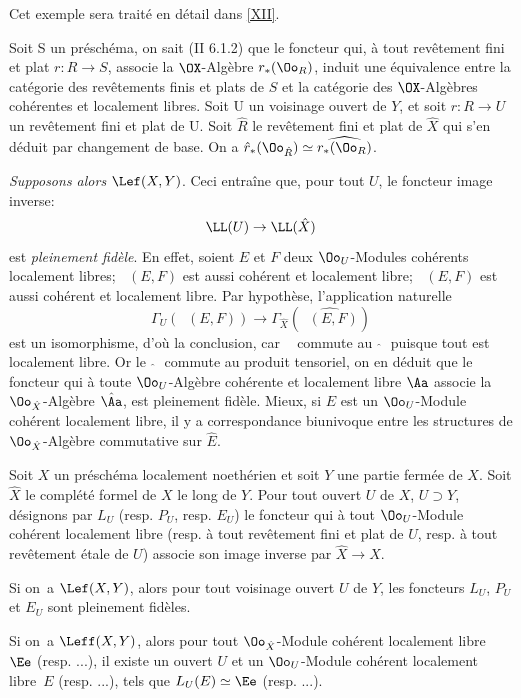 Cet exemple sera trait\'e en d\'etail dans \Exp \ref{XII}.

Soit S un pr\'esch\'ema, on sait (\EGA II 6.1.2) que le foncteur qui, \`a tout rev\^etement fini et plat $r\colon R\to S$, associe la $\OX$-Alg\`ebre $r_\ast(\Oo_R)$, induit une \'equivalence entre la cat\'egorie des rev\^etements finis et plats de $S$ et la cat\'egorie des $\OX$-Alg\`ebres coh\'erentes et localement libres. Soit U un voisinage ouvert de $Y$, et soit $r\colon R\to U$ un rev\^etement fini et plat de U. Soit $\hat{R}$ le rev\^etement fini et plat de $\hat{X}$ qui s'en d\'eduit par changement de base. On a $\hat{r}_\ast(\Oo_{\hat{R}})\simeq\widehat{r_\ast(\Oo_R)}$.

\emph{Supposons alors} $\Lef(X, Y)$. Ceci entra\^ine que, pour tout $U$, le foncteur image inverse:
\[
\LL(U) \to \LL(\hat{X})
\]
est \emph{pleinement fidèle}. En effet, soient $E$ et $F$ deux $\Oo_U$-Modules coh\'erents localement libres; $\mathop{\underline{\mathrm{Hom}}}\nolimits(E, F)$ est aussi coh\'erent et localement libre; $\mathop{\underline{\mathrm{Hom}}}\nolimits(E, F)$ est aussi coh\'erent et localement libre. Par hypoth\`ese, l'application naturelle
\[
\Gamma_U (\mathop{\underline{\mathrm{Hom}}}\nolimits(E, F)) \to \Gamma_{\hat{X}}(\widehat{\mathop{\underline{\mathrm{Hom}}}\nolimits(E, F)})
\]
est un isomorphisme, d'o\`u la conclusion, car $\mathop{\underline{\mathrm{Hom}}}\nolimits$ commute au $\, \, \hat{}\, \, $ puisque tout est localement libre. Or le $\, \, \hat{}\, \, $ commute au produit tensoriel, on en d\'eduit que le foncteur qui \`a toute $\Oo_U$-Alg\`ebre coh\'erente et localement libre $\Aa$ associe la $\Oo_{\hat{X}}$-Alg\`ebre $\hat{\Aa}$, est pleinement fid\`ele. Mieux, si $E$ est un $\Oo_U$-Module coh\'erent localement libre, il y a correspondance biunivoque entre les structures de $\Oo_{\hat{X}}$-Alg\`ebre commutative sur $\hat{E}$.

\begin{proposition} \label{X.2.3}
Soit $X$ un pr\'esch\'ema localement noeth\'erien et soit $Y$ une partie ferm\'ee de $X$. Soit $\hat{X}$ le compl\'et\'e formel de $X$ le long de $Y$. Pour tout ouvert $U$ de $X$, $U\supset Y$, d\'esignons par $L_U$ (resp. $P_U$, resp. $E_U$) le foncteur qui \`a tout $\Oo_U$-Module coh\'erent localement libre (resp. \`a tout rev\^etement fini et plat de $U$, resp. \`a tout rev\^etement \'etale de $U$) associe son image inverse par $\hat{X} \to X$.
\begin{enumeratei}
\item
Si on~a $\Lef(X, Y)$, alors pour tout voisinage ouvert $U$ de $Y$, les foncteurs $L_U$, $P_U$ et $E_U$ sont pleinement fid\`eles.

\item
Si on~a $\Leff(X, Y)$, alors pour tout $\Oo_{\hat{X}}$-Module coh\'erent localement libre~$\Ee$ (resp. ...), il existe un ouvert $U$ et un $\Oo_U$-Module coh\'erent localement libre~$E$ (resp. ...), tels que $L_U(E) \simeq \Ee$ (resp. ...).
\end{enumeratei}
\end{proposition}

